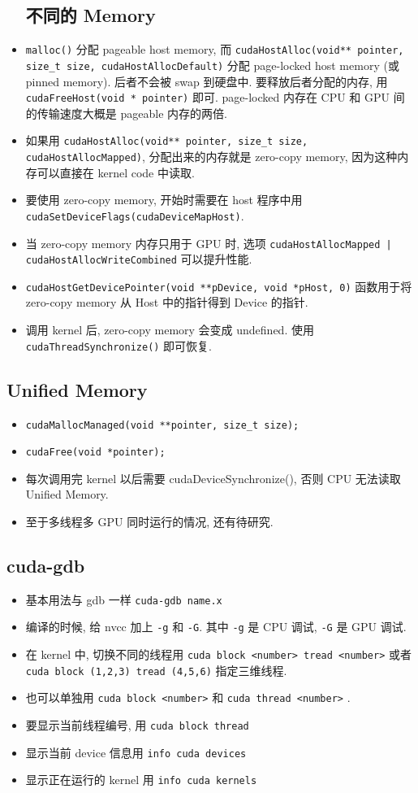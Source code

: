 \begin{itemize}
\subsection{不同的 Memory}
\item \verb`malloc()` 分配 pageable host memory, 而 \verb`cudaHostAlloc(void** pointer, size_t size, cudaHostAllocDefault)` 分配 page-locked host memory (或 pinned memory). 后者不会被 swap 到硬盘中. 要释放后者分配的内存, 用 \verb`cudaFreeHost(void * pointer)` 即可. page-locked 内存在 CPU 和 GPU 间的传输速度大概是 pageable 内存的两倍.
\item 如果用 \verb`cudaHostAlloc(void** pointer, size_t size, cudaHostAllocMapped)`, 分配出来的内存就是 zero-copy memory, 因为这种内存可以直接在 kernel code 中读取.
\item 要使用 zero-copy memory, 开始时需要在 host 程序中用 \verb`cudaSetDeviceFlags(cudaDeviceMapHost)`.
\item 当 zero-copy memory 内存只用于 GPU 时, 选项 \verb`cudaHostAllocMapped | cudaHostAllocWriteCombined` 可以提升性能.
\item \verb`cudaHostGetDevicePointer(void **pDevice, void *pHost, 0)` 函数用于将 zero-copy memory 从 Host 中的指针得到 Device 的指针.
\item 调用 kernel 后, zero-copy memory 会变成 undefined. 使用 \verb`cudaThreadSynchronize()` 即可恢复.
\end{itemize}

\subsection{Unified Memory}
\begin{itemize}
\item \verb|cudaMallocManaged(void **pointer, size_t size);|
\item \verb|cudaFree(void *pointer);|
\item 每次调用完 kernel 以后需要 cudaDeviceSynchronize(), 否则 CPU 无法读取 Unified Memory.
\item 至于多线程多 GPU 同时运行的情况, 还有待研究.
\end{itemize}

\subsection{cuda-gdb}
\begin{itemize}
\item 基本用法与 gdb 一样 \verb|cuda-gdb name.x|
\item 编译的时候, 给 nvcc 加上 \verb`-g` 和 \verb`-G`. 其中 \verb`-g` 是 CPU 调试, \verb`-G` 是 GPU 调试.
\item 在 kernel 中, 切换不同的线程用
\verb`cuda block <number> tread <number>` 或者 \verb`cuda block (1,2,3) tread (4,5,6)` 指定三维线程.
\item 也可以单独用 \verb`cuda block <number>` 和 \verb`cuda thread <number>` .
\item 要显示当前线程编号, 用 \verb`cuda block thread`
\item 显示当前 device 信息用 \verb`info cuda devices`
\item 显示正在运行的 kernel 用 \verb`info cuda kernels`
\end{itemize}
